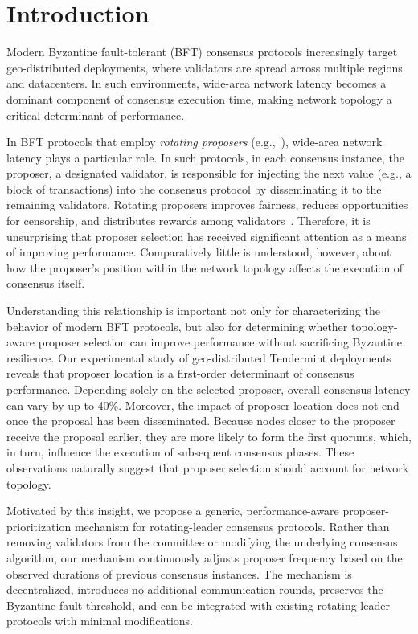 \section{Introduction}

Modern Byzantine fault-tolerant (BFT) consensus protocols increasingly target geo-distributed deployments, where validators are spread across multiple regions and datacenters. 
In such environments, wide-area network latency becomes a dominant component of consensus execution time, making network topology a critical determinant of performance. 

In BFT protocols that employ \emph{rotating proposers} (e.g.,~\cite{eischer2018latency}), wide-area network latency plays a particular role.
In such protocols, in each consensus instance, the proposer, a designated validator, is responsible for injecting the next value (e.g., a block of transactions) into the consensus protocol by disseminating it to the remaining validators. 
Rotating proposers improves fairness, reduces opportunities for censorship, and distributes rewards among validators~\cite{buchman2016tendermint}. 
Therefore, it is unsurprising that proposer selection has received significant attention as a means of improving performance.
Comparatively little is understood, however, about how the proposer's position within the network topology affects the execution of consensus itself.

Understanding this relationship is important not only for characterizing the behavior of modern BFT protocols, but also for determining whether topology-aware proposer selection can improve performance without sacrificing Byzantine resilience. 
Our experimental study of geo-distributed Tendermint deployments reveals that proposer location is a first-order determinant of consensus performance. 
Depending solely on the selected proposer, overall consensus latency can vary by up to 40\%. 
Moreover, the impact of proposer location does not end once the proposal has been disseminated. 
Because nodes closer to the proposer receive the proposal earlier, they are more likely to form the first quorums, which, in turn, influence the execution of subsequent consensus phases. 
These observations naturally suggest that proposer selection should account for network topology. 

Motivated by this insight, we propose a generic, performance-aware proposer-prioritization mechanism for rotating-leader consensus protocols. 
Rather than removing validators from the committee or modifying the underlying consensus algorithm, our mechanism continuously adjusts proposer frequency based on the observed durations of previous consensus instances. 
The mechanism is decentralized, introduces no additional communication rounds, preserves the Byzantine fault threshold, and can be integrated with existing rotating-leader protocols with minimal modifications. 

